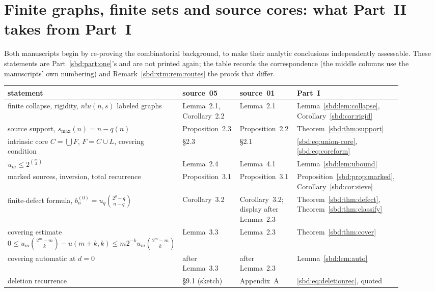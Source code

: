 \documentclass[11pt,a4paper]{article}
\theoremstyle{definition}
\begin{document}
\section{Finite graphs, finite sets and source cores: what Part~II takes from Part~I}
\label{sbd:xtm:sec:cores}

Both manuscripts begin by re-proving the combinatorial background, to make
their analytic conclusions independently assessable. These statements are
Part~\ref{sbd:part:one}'s and are not printed again; the table records the
correspondence (the middle columns use the manuscripts' own numbering) and
Remark~\ref{sbd:xtm:rem:routes} the proofs that differ.
\begin{center}\footnotesize
\begin{tabular}{@{}>{\raggedright\arraybackslash}p{0.34\linewidth}>{\raggedright\arraybackslash}p{0.20\linewidth}>{\raggedright\arraybackslash}p{0.20\linewidth}>{\raggedright\arraybackslash}p{0.16\linewidth}@{}}
\toprule
statement & source~05 & source~01 & Part~I\\
\midrule
finite collapse, rigidity, $n!u(n,s)$ labeled graphs & Lemma~2.1, Corollary~2.2 & Lemma~2.1 & Lemma~\ref{sbd:lem:collapse}, Corollary~\ref{sbd:cor:rigid}\\
source support, $s_{\max}(n)=n-q(n)$ & Proposition~2.3 & Proposition~2.2 & Theorem~\ref{sbd:thm:support}\\
intrinsic core $C=\bigcup F$, $F=C\cup L$, covering condition & \S2.3 & \S2.1 & \eqref{sbd:eq:union-core}, \eqref{sbd:eq:coreform}\\
$u_m\le2^{\binom m2}$ & Lemma~2.4 & Lemma~4.1 & Lemma~\ref{sbd:lem:ubound}\\
marked sources, inversion, total recurrence & Proposition~3.1 & Proposition~3.1 & Proposition~\ref{sbd:prop:marked}, Corollary~\ref{sbd:cor:sieve}\\
finite-defect formula, $b_n^{(0)}=u_q\binom{2^q-q}{n-q}$ & Corollary~3.2 & Corollary~3.2; display after Lemma~2.3 & Theorem~\ref{sbd:thm:defect}, Theorem~\ref{sbd:thm:classify}\\
covering estimate $0\le u_m\binom{2^m-m}k-u(m+k,k)\le m2^{-k}u_m\binom{2^m-m}k$ & Lemma~3.3 & Lemma~2.3 & Theorem~\ref{sbd:thm:cover}\\
covering automatic at $d=0$ & after Lemma~3.3 & after Lemma~2.3 & Lemma~\ref{sbd:lem:auto}\\
deletion recurrence & \S9.1 (sketch) & Appendix~A & \eqref{sbd:eq:deletionrec}, quoted\\
\bottomrule
\end{tabular}
\end{center}
\end{document}
